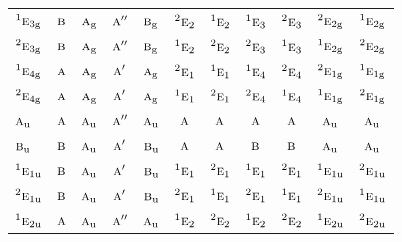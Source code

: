 \documentclass[10pt,a4paper]{article}
\numberwithin{equation}{section}
\newcommand{\irr}[1]{\text{\normalfont\scshape #1}}
\newcommand{\conjpair}[1]{{}^{#1}}
\newcommand{\ptag}[1]{\mathrm{#1}}
\begin{document}
{\begin{longtable}{@{}lcccccccccc@{}}
$\conjpair{1}\irr{e}_{3\ptag{g}}$ & $\irr{b}$ & $\irr{a}_{\ptag{g}}$ & $\irr{a}''$ & $\irr{b}_{\ptag{g}}$ & $\conjpair{2}\irr{e}_{2}$ & $\conjpair{1}\irr{e}_{2}$ & $\conjpair{1}\irr{e}_{3}$ & $\conjpair{2}\irr{e}_{3}$ & $\conjpair{2}\irr{e}_{2\ptag{g}}$ & $\conjpair{1}\irr{e}_{2\ptag{g}}$\\
$\conjpair{2}\irr{e}_{3\ptag{g}}$ & $\irr{b}$ & $\irr{a}_{\ptag{g}}$ & $\irr{a}''$ & $\irr{b}_{\ptag{g}}$ & $\conjpair{1}\irr{e}_{2}$ & $\conjpair{2}\irr{e}_{2}$ & $\conjpair{2}\irr{e}_{3}$ & $\conjpair{1}\irr{e}_{3}$ & $\conjpair{1}\irr{e}_{2\ptag{g}}$ & $\conjpair{2}\irr{e}_{2\ptag{g}}$\\
$\conjpair{1}\irr{e}_{4\ptag{g}}$ & $\irr{a}$ & $\irr{a}_{\ptag{g}}$ & $\irr{a}'$ & $\irr{a}_{\ptag{g}}$ & $\conjpair{2}\irr{e}_{1}$ & $\conjpair{1}\irr{e}_{1}$ & $\conjpair{1}\irr{e}_{4}$ & $\conjpair{2}\irr{e}_{4}$ & $\conjpair{2}\irr{e}_{1\ptag{g}}$ & $\conjpair{1}\irr{e}_{1\ptag{g}}$\\
$\conjpair{2}\irr{e}_{4\ptag{g}}$ & $\irr{a}$ & $\irr{a}_{\ptag{g}}$ & $\irr{a}'$ & $\irr{a}_{\ptag{g}}$ & $\conjpair{1}\irr{e}_{1}$ & $\conjpair{2}\irr{e}_{1}$ & $\conjpair{2}\irr{e}_{4}$ & $\conjpair{1}\irr{e}_{4}$ & $\conjpair{1}\irr{e}_{1\ptag{g}}$ & $\conjpair{2}\irr{e}_{1\ptag{g}}$\\
$\irr{a}_{\ptag{u}}$ & $\irr{a}$ & $\irr{a}_{\ptag{u}}$ & $\irr{a}''$ & $\irr{a}_{\ptag{u}}$ & $\irr{a}$ & $\irr{a}$ & $\irr{a}$ & $\irr{a}$ & $\irr{a}_{\ptag{u}}$ & $\irr{a}_{\ptag{u}}$\\
$\irr{b}_{\ptag{u}}$ & $\irr{b}$ & $\irr{a}_{\ptag{u}}$ & $\irr{a}'$ & $\irr{b}_{\ptag{u}}$ & $\irr{a}$ & $\irr{a}$ & $\irr{b}$ & $\irr{b}$ & $\irr{a}_{\ptag{u}}$ & $\irr{a}_{\ptag{u}}$\\
$\conjpair{1}\irr{e}_{1\ptag{u}}$ & $\irr{b}$ & $\irr{a}_{\ptag{u}}$ & $\irr{a}'$ & $\irr{b}_{\ptag{u}}$ & $\conjpair{1}\irr{e}_{1}$ & $\conjpair{2}\irr{e}_{1}$ & $\conjpair{1}\irr{e}_{1}$ & $\conjpair{2}\irr{e}_{1}$ & $\conjpair{1}\irr{e}_{1\ptag{u}}$ & $\conjpair{2}\irr{e}_{1\ptag{u}}$\\
$\conjpair{2}\irr{e}_{1\ptag{u}}$ & $\irr{b}$ & $\irr{a}_{\ptag{u}}$ & $\irr{a}'$ & $\irr{b}_{\ptag{u}}$ & $\conjpair{2}\irr{e}_{1}$ & $\conjpair{1}\irr{e}_{1}$ & $\conjpair{2}\irr{e}_{1}$ & $\conjpair{1}\irr{e}_{1}$ & $\conjpair{2}\irr{e}_{1\ptag{u}}$ & $\conjpair{1}\irr{e}_{1\ptag{u}}$\\
$\conjpair{1}\irr{e}_{2\ptag{u}}$ & $\irr{a}$ & $\irr{a}_{\ptag{u}}$ & $\irr{a}''$ & $\irr{a}_{\ptag{u}}$ & $\conjpair{1}\irr{e}_{2}$ & $\conjpair{2}\irr{e}_{2}$ & $\conjpair{1}\irr{e}_{2}$ & $\conjpair{2}\irr{e}_{2}$ & $\conjpair{1}\irr{e}_{2\ptag{u}}$ & $\conjpair{2}\irr{e}_{2\ptag{u}}$\\

\end{longtable}}
\end{document}

